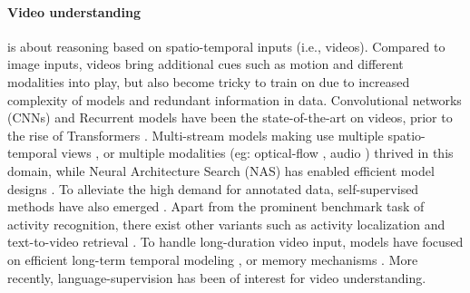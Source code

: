 \documentclass[10pt,twocolumn,letterpaper]{article}
\begin{document}
\paragraph{Video understanding} is about reasoning based on spatio-temporal inputs (i.e., videos). Compared to image inputs, videos bring additional cues such as motion and different modalities into play, but also become tricky to train on due to increased complexity of models and redundant information in data. Convolutional networks (CNNs) \cite{carreira2017i3d, xie2017s3d, tran2018r2p1d, wang2018nonlocal} and Recurrent models \cite{escorcia2016daps, yeung2018every} have been the state-of-the-art on videos, prior to the rise of Transformers \cite{arnab2021vivit, bertasius2021timesformer, liu2022videoswin, ryoo2021tokenlearner}. Multi-stream models \cite{carreira2017i3d, feichtenhofer2019slowfast} making use multiple spatio-temporal views \cite{feichtenhofer2019slowfast, recasens2021brave}, or multiple modalities (eg: optical-flow \cite{carreira2017i3d, han2020self}, audio \cite{nagrani2021bottleneck, huang2022mavil, recasens2023zorro}) thrived in this domain, while Neural Architecture Search (NAS) has enabled efficient model designs \cite{feichtenhofer2020x3d, ryoo2019assemblenet, ryoo2020assemblenet++}. To alleviate the high demand for annotated data, self-supervised methods have also emerged \cite{recasens2021brave, han2020self, qian2021spatiotemporal, feichtenhofer2021large}. Apart from the prominent benchmark task of activity recognition, there exist other variants such as activity localization \cite{sigurdsson2016hollywood, gu2018ava, yeung2018every} and text-to-video retrieval \cite{xu2016msrvtt}. To handle long-duration video input, models have focused on efficient long-term temporal modeling \cite{piergiovanni2018superevents, piergiovanni2019tgm, kahatapitiya2021coarsefine, dai2022ms}, or memory mechanisms \cite{wu2019long, wu2022memvit, ryoo2022ttm}. More recently, language-supervision has been of interest for video understanding.
\end{document}
